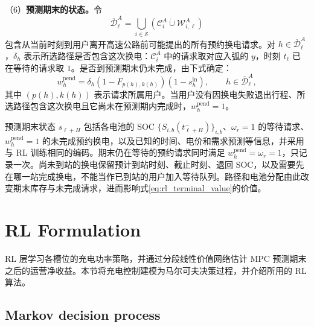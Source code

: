 \documentclass[12pt,a4paper,UTF8]{ctexart}
\begin{document}
（6）\textbf{预测期末的状态。}令
\[
\overline{\mathcal D}_\ell^A
=\bigcup_{i\in\mathcal S}(\mathcal C_i^A\mathbin{\dot\cup}\mathcal W_{i,\ell}^A)
\]
包含从当前时刻到用户离开高速公路前可能提出的所有预约换电请求。对 $h\in\overline{\mathcal D}_\ell^A$，$\delta_h$ 表示所选路径是否包含这次换电：$\mathcal C_i^A$ 中的请求取对应入弧的 $y$，时刻 $t_\ell$ 已在等待的请求取 $1$。是否到预测期末仍未完成，由下式确定：
\begin{equation}
w_h^{\mathrm{pend}}=\delta_h(1-F_{p(h),k(h)})(1-s_h^{\mathrm{in}}),
\qquad h\in\overline{\mathcal D}_\ell^A,
\label{eq:pending_delivery_alive}
\end{equation}
其中 $(p(h),k(h))$ 表示请求所属用户。当用户没有因换电失败退出行程、所选路径包含这次换电且它尚未在预测期内完成时，$w_h^{\mathrm{pend}}=1$。

预测期末状态 $s_{\ell+H}$ 包括各电池的 SOC $\{S_{i,b}(t_{\ell+H}^-)\}_{i,b}$、$\omega_r=1$ 的等待请求、$w_h^{\mathrm{pend}}=1$ 的未完成预约换电，以及已知的时间、电价和需求预测等信息，并采用与 RL 训练相同的编码。期末仍在等待的预约请求同时满足 $w_h^{\mathrm{pend}}=\omega_r=1$，只记录一次。尚未到站的换电保留预计到站时刻、截止时刻、退回 SOC，以及需要先在哪一站完成换电，不能当作已到站的用户加入等待队列。路径和电池分配由此改变期末库存与未完成请求，进而影响式\eqref{eq:rl_terminal_value}的价值。


\section{RL Formulation}

RL 层学习各槽位的充电功率策略，并通过分段线性价值网络估计 MPC 预测期末之后的运营净收益。本节将充电控制建模为马尔可夫决策过程，并介绍所用的 RL 算法。

\subsection{Markov decision process}
\end{document}
